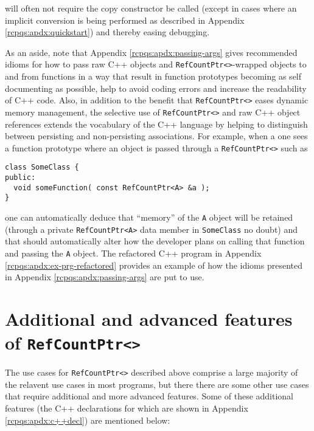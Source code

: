 \documentclass[pdf,ps2pdf,11pt]{SANDreport}
\begin{document}
{}\noindent{}will often not require the copy constructor be called
(except in cases where an implicit conversion is being performed as
described in Appendix {}\ref{rcpqs:apdx:quickstart}) and thereby
easing debugging.

As an aside, note that Appendix {}\ref{rcpqs:apdx:passing-args} gives
recommended idioms for how to pass raw C++ objects and
{}\texttt{Ref\-Count\-Ptr<>}-wrapped objects to and from functions in
a way that result in function prototypes becoming as self documenting
as possible, help to avoid coding errors and increase the readability
of C++ code.  Also, in addition to the benefit that
{}\texttt{Ref\-Count\-Ptr<>} eases dynamic memory management, the
selective use of {}\texttt{Ref\-Count\-Ptr<>} and raw C++ object
references extends the vocabulary of the C++ language by helping to
distinguish between persisting and non-persisting associations.  For
example, when a one sees a function prototype where an object is
passed through a {}\texttt{Ref\-Count\-Ptr<>} such as

{\small\begin{verbatim}
class SomeClass {
public:
  void someFunction( const RefCountPtr<A> &a );
}
\end{verbatim}}

{}\noindent{}one can automatically deduce that ``memory'' of the
{}\texttt{A} object will be retained (through a private
{}\texttt{Ref\-Count\-Ptr<A>} data member in {}\texttt{Some\-Class} no
doubt) and that should automatically alter how the developer plans on
calling that function and passing the {}\texttt{A} object.  The
refactored C++ program in Appendix
{}\ref{rcpqs:apdx:ex-prg-refactored} provides an example of how the
idioms presented in Appendix {}\ref{rcpqs:apdx:passing-args} are put
to use.

%
\section{Additional and advanced features of {}\texttt{Ref\-Count\-Ptr<>}}
%

The use cases for {}\texttt{Ref\-Count\-Ptr<>} described above
comprise a large majority of the relavent use cases in most programs,
but there there are some other use cases that require additional and
more advanced features.  Some of these additional features (the C++
declarations for which are shown in Appendix
{}\ref{rcpqs:apdx:c++decl}) are mentioned below:
\end{document}
